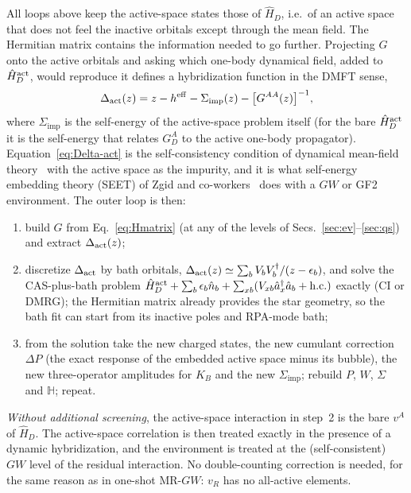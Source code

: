 \documentclass[11pt,a4paper]{article}
\newcommand{\bbH}{\mathbb{H}}
\newcommand{\GW}{$GW$}
\newcommand{\MRGW}{MR-$GW$}
\newcommand{\imp}{\mathrm{imp}}
\begin{document}
All loops above keep the active-space states those of $\hat H_D$, i.e.\ of
an active space that does not feel the inactive orbitals except through the
mean field.  The Hermitian matrix contains the information needed to go
further.  Projecting $G$ onto the active orbitals and asking which one-body
dynamical field, added to $\hat H^{\rm act}_D$, would reproduce it defines a
hybridization function in the DMFT sense,
\begin{equation}
  \Delta_{\rm act}(z)=z-h^{\rm eff}-\Sigma_{\imp}(z)-\bigl[G^{AA}(z)\bigr]^{-1},
  \label{eq:Delta-act}
\end{equation}
where $\Sigma_{\imp}$ is the self-energy of the active-space problem itself
(for the bare $\hat H^{\rm act}_D$ it is the self-energy that relates $G^A_D$
to the active one-body propagator).  Equation~\eqref{eq:Delta-act} is the
self-consistency condition of dynamical mean-field
theory~\cite{Georges1996} with the active space as the impurity, and it is
what self-energy embedding theory (SEET) of Zgid and
co-workers~\cite{Lan2015,Lan2017} does with a \GW{} or GF2 environment.  The
outer loop is then:
\begin{enumerate}[leftmargin=2em]
\item build $G$ from Eq.~\eqref{eq:Hmatrix} (at any of the levels of
  Secs.~\ref{sec:ev}--\ref{sec:qs}) and extract $\Delta_{\rm act}(z)$;
\item discretize $\Delta_{\rm act}$ by bath orbitals,
  $\Delta_{\rm act}(z)\simeq\sum_bV_bV_b^\dagger/(z-\epsilon_b)$, and solve
  the CAS-plus-bath problem $\hat H^{\rm act}_D+\sum_b\epsilon_b\hat n_b
  +\sum_{xb}(V_{xb}\hat a_x^\dagger\hat a_b+\mathrm{h.c.})$ exactly (CI or
  DMRG); the Hermitian matrix already provides the star geometry, so the
  bath fit can start from its inactive poles and RPA-mode bath;
\item from the solution take the new charged states, the new cumulant
  correction $\Delta P$ (the exact response of the embedded active space
  minus its bubble), the new three-operator amplitudes for $K_B$ and the new
  $\Sigma_{\imp}$; rebuild $P$, $W$, $\Sigma$ and $\bbH$; repeat.
\end{enumerate}
\emph{Without additional screening}, the active-space interaction in step~2
is the bare $v^A$ of $\hat H_D$.  The active-space correlation is then
treated exactly in the presence of a dynamic hybridization, and the
environment is treated at the (self-consistent) \GW{} level of the residual
interaction.  No double-counting correction is needed, for the same reason
as in one-shot \MRGW{}: $v_R$ has no all-active elements.
\end{document}
